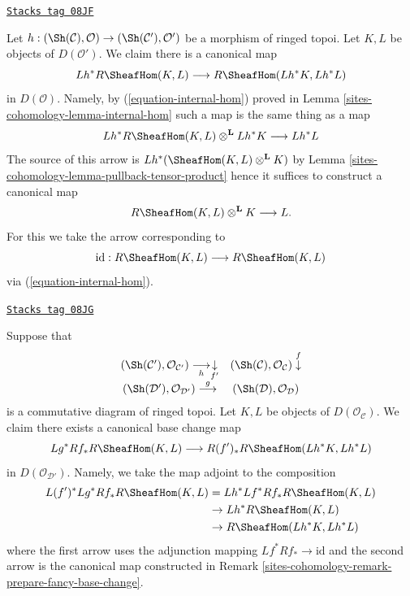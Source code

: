 \begin{remark}
\label{sites-cohomology-remark-prepare-fancy-base-change}
\href{https://stacks.math.columbia.edu/tag/08JF}{\texttt{Stacks tag 08JF}}

Let $h : (\Sh(\mathcal{C}), \mathcal{O}) \to (\Sh(\mathcal{C}'), \mathcal{O}')$
be a morphism of ringed topoi. Let $K, L$ be objects of $D(\mathcal{O}')$.
We claim there is a canonical map
$$
Lh^*R\SheafHom(K, L) \longrightarrow R\SheafHom(Lh^*K, Lh^*L)
$$
in $D(\mathcal{O})$. Namely, by (\ref{equation-internal-hom})
proved in Lemma \ref{sites-cohomology-lemma-internal-hom}
such a map is the same thing as a map
$$
Lh^*R\SheafHom(K, L) \otimes^\mathbf{L} Lh^*K \longrightarrow Lh^*L
$$
The source of this arrow is $Lh^*(\SheafHom(K, L) \otimes^\mathbf{L} K)$
by Lemma \ref{sites-cohomology-lemma-pullback-tensor-product}
hence it suffices to construct a canonical map
$$
R\SheafHom(K, L) \otimes^\mathbf{L} K \longrightarrow L.
$$
For this we take the arrow corresponding to
$$
\text{id} :
R\SheafHom(K, L)
\longrightarrow
R\SheafHom(K, L)
$$
via (\ref{equation-internal-hom}).
\end{remark}

\begin{remark}
\label{sites-cohomology-remark-fancy-base-change}
\href{https://stacks.math.columbia.edu/tag/08JG}{\texttt{Stacks tag 08JG}}

Suppose that
$$
\begin{array}{cc}(\Sh(\mathcal{C}'), \mathcal{O}_{\mathcal{C}'})
\underset{h}{\longrightarrow}\underset{f'}{\downarrow} & (\Sh(\mathcal{C}), \mathcal{O}_\mathcal{C}) \overset{f}{\downarrow} \\ (\Sh(\mathcal{D}'), \mathcal{O}_{\mathcal{D}'})
\overset{g}{\longrightarrow} & (\Sh(\mathcal{D}), \mathcal{O}_\mathcal{D})\end{array}
$$
is a commutative diagram of ringed topoi. Let $K, L$ be objects
of $D(\mathcal{O}_\mathcal{C})$. We claim there exists a canonical base change
map
$$
Lg^*Rf_*R\SheafHom(K, L)
\longrightarrow
R(f')_*R\SheafHom(Lh^*K, Lh^*L)
$$
in $D(\mathcal{O}_{\mathcal{D}'})$. Namely, we take the map adjoint to
the composition
\begin{align*}
L(f')^*Lg^*Rf_*R\SheafHom(K, L)
& =
Lh^*Lf^*Rf_*R\SheafHom(K, L) \\
& \to
Lh^*R\SheafHom(K, L) \\
& \to
R\SheafHom(Lh^*K, Lh^*L)
\end{align*}
where the first arrow uses the adjunction mapping
$Lf^*Rf_* \to \text{id}$ and the second arrow is the canonical map
constructed in Remark \ref{sites-cohomology-remark-prepare-fancy-base-change}.
\end{remark}


